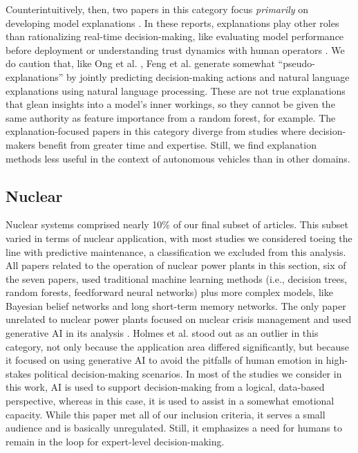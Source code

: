 \documentclass[authoryear,preprint,12pt]{elsarticle}
\begin{document}
Counterintuitively, then, two papers in this category focus \textit{primarily}
on developing model explanations
\cite{fengNLEDMNaturallanguageExplanations2023,kanekoPredictingTrustDynamics2025}. In these reports, explanations play
other roles than rationalizing real-time decision-making, like evaluating model
performance before deployment \cite{fengNLEDMNaturallanguageExplanations2023} or
understanding trust dynamics with human operators
\cite{kanekoPredictingTrustDynamics2025}. We do caution that, like Ong et al.
\cite{ongLargeLanguageModel2025}, Feng et al.
\cite{fengNLEDMNaturallanguageExplanations2023} generate somewhat
``pseudo-explanations'' by jointly predicting decision-making actions and
natural language explanations using natural language processing. These are not
true explanations that glean insights into a model's inner workings, so they
cannot be given the same authority as feature importance from a random forest,
for example. The explanation-focused papers in this category diverge from
studies where decision-makers benefit from greater time and expertise. Still, we
find explanation methods less useful in the context of autonomous vehicles than
in other domains. 

\subsection{Nuclear}
Nuclear systems comprised nearly 10\% of our final subset of articles. This
subset varied in terms of nuclear application, with most studies we considered
toeing the line with predictive maintenance, a classification we excluded from
this analysis. All papers related to the operation of nuclear power plants in
this section, six of the seven papers, used traditional machine learning methods
(i.e., decision trees, random forests, feedforward neural networks) plus more
complex models, like Bayesian belief networks and long short-term memory
networks. The only paper unrelated to nuclear power plants focused on nuclear
crisis management and used generative AI in its analysis
\cite{holmesRoleArtificialIntelligence2024}. Holmes et al.
\cite{holmesRoleArtificialIntelligence2024} stood out as an outlier in this
category, not only because the application area differed significantly, but
because it focused on using generative AI to avoid the pitfalls of human emotion
in high-stakes political decision-making scenarios. In most of the studies we
consider in this work, AI is used to support decision-making from a logical,
data-based perspective, whereas in this case, it is used to assist in a somewhat
emotional capacity. While this paper met all of our inclusion criteria, it
serves a small audience and is basically unregulated. Still, it emphasizes a
need for humans to remain in the loop for expert-level decision-making. 
\end{document}
